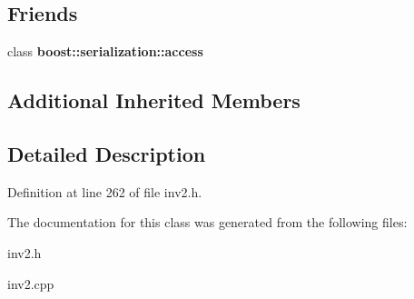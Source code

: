 \subsection*{Friends}
\begin{DoxyCompactItemize}
\item 
\hypertarget{class_shield_ac98d07dd8f7b70e16ccb9a01abf56b9c}{}\label{class_shield_ac98d07dd8f7b70e16ccb9a01abf56b9c} 
class {\bfseries boost\+::serialization\+::access}
\end{DoxyCompactItemize}
\subsection*{Additional Inherited Members}


\subsection{Detailed Description}


Definition at line 262 of file inv2.\+h.



The documentation for this class was generated from the following files\+:\begin{DoxyCompactItemize}
\item 
inv2.\+h\item 
inv2.\+cpp\end{DoxyCompactItemize}
